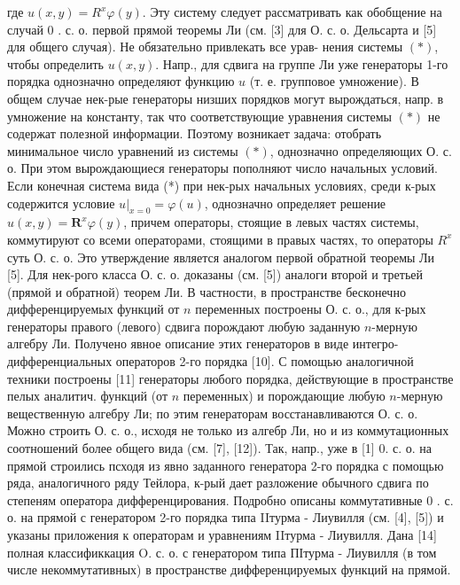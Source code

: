 \documentclass[10pt]{article}
\begin{document}
где $u(x, y)=R^{x} \varphi(y)$. Эту систему следует рассматривать как обобщение на случай 0 . с. о. первой прямой теоремы Ли (см. [3] для О. с. о. Дельсарта и [5] для общего случая). Не обязательно привлекать все урав- нения системы $(*)$, чтобы определить $u(x, y)$. Напр., для сдвига на группе Ли уже генераторы 1-го порядка однозначно определяют функцию $u$ (т. е. групповое умножение). В общем случае нек-рые генераторы низших порядков могут вырождаться, напр. в умножение на константу, так что соответствующие уравнения системы $(*)$ не содержат полезной информации. Поэтому возникает задача: отобрать минимальное число уравнений из системы $(*)$, однозначно определяющих О. с. о. При этом вырождающиеся генераторы пополняют число начальных условий. Если конечная система вида (*) при нек-рых начальных условиях, среди к-рых содержится условие $\left.u\right|_{x=0}=\varphi(u)$, однозначно определяет решение $u(x, y)=\boldsymbol{R}^{x} \varphi(y)$, причем операторы, стоящие в левых частях системы, коммутируют со всеми операторами, стоящими в правых частях, то операторы $R^{x}$ суть О. с. о. Это утверждение является аналогом первой обратной теоремы Ли [5]. Для нек-рого класса О. с. о. доказаны (см. [5]) аналоги второй и третьей (прямой и обратной) теорем Ли. В частности, в пространстве бесконечно дифференцируемых функций от $n$ переменных построены О. с. о., для к-рых генераторы правого (левого) сдвига порождают любую заданную $n$-мерную алгебру Ли. Получено явное описание этих генераторов в виде интегро-дифференциальных операторов 2-го порядка [10]. С помощью аналогичной техники построены [11] генераторы любого порядка, действующие в пространстве пелых аналитич. функций (от $n$ переменных) и порождающие любую $n$-мерную вещественную алгебру Ли; по этим генераторам восстанавливаются О. с. о. Можно строить О. с. о., исходя не только из алгебр Ли, но и из коммутационных соотношений более общего вида (см. [7], [12]). Так, напр., уже в [1] 0. с. о. на прямой строились псходя из явно заданного генератора 2-го порядка с помощью ряда, аналогичного ряду Тейлора, к-рый дает разложение обычного сдвига по степеням оператора дифференцирования. Подробно описаны коммутативные 0 . с. о. на прямой с генератором 2-го порядка типа IIтурма - Лиувилля (см. [4], [5]) и указаны приложения к операторам и уравнениям IIтурма - Лиувилля. Дана [14] полная классификкация O. с. о. с генератором типа ПІтурма - Лиувилля (в том числе некоммутативных) в пространстве дифференцируемых функций на прямой.
\end{document}
